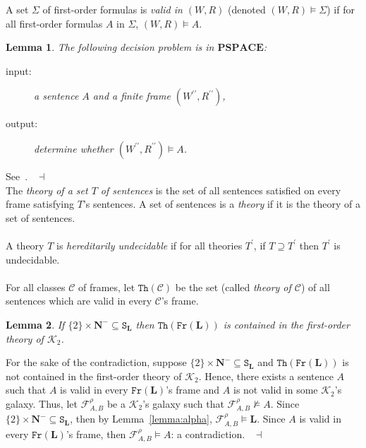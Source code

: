 \documentclass[draft]{article}
\newtheorem{lemma}{Lemma}
\newenvironment{proof}{{\bf Proof:}}{~$\dashv$\\}
\def\Th{\mathtt{Th}}
\def\Fr{\mathtt{Fr}}
\def\PSPACE{\mathbf{PSPACE}}
\def\L{\mathbf{L}}
\begin{document}
A set $\Sigma$ of first-order formulas is {\it valid in $(W,R)$}\/ (denoted $(W,R){\models}\Sigma$) if for all first-order formulas $A$ in $\Sigma$, $(W,R){\models}A$.
%
%
\begin{lemma}\label{lemma:validity:in:a:given:frame:is:in:coNP:fol}
%
%
The following decision problem is in $\PSPACE$:
%
%
\begin{description}
%
%
\item[input:] a sentence $A$ and a finite frame $(W^{\prime\prime},R^{\prime\prime})$,
%
%
\item[output:] determine whether $(W^{\prime\prime},R^{\prime\prime}){\models}A$.
%
%
\end{description}
%
%
\end{lemma}
%
%
\begin{proof}
%
%
See~\cite{Vardi:1982}.
%
%
\medskip
%
%
\end{proof}
%
%
The {\it theory of a set $T$ of sentences}\/ is the set of all sentences satisfied on every frame satisfying $T$'s sentences.
A set of sentences is a {\it theory}\/ if it is the theory of a set of sentences.
%
%
\\
\\
%
%
A theory $T$ is {\it hereditarily undecidable}\/ if for all theories $T^{\prime}$, if $T{\supseteq}T^{\prime}$ then $T^{\prime}$ is undecidable.
%
%
\\
\\
%
%
For all classes ${\mathcal C}$ of frames, let $\Th({\mathcal C})$ be the set (called {\it theory of ${\mathcal C}$}) of all sentences which are valid in every ${\mathcal C}$'s frame.
%
%
\begin{lemma}\label{lemma:gamma}
%
%
If $\{2\}{\times}\mathbf{N}^{-}{\subseteq}\mathtt{S}_{\L}$ then $\Th(\Fr(\L))$ is contained in the first-order
%
%
%
%
%
%
%
%
%
%
%
%
\linebreak
%
%
%
%
%
%
%
%
%
%
%
%
theory of ${\mathcal K}_{2}$.
%
%
\end{lemma}
%
%
\begin{proof}
%
%
For the sake of the contradiction, suppose $\{2\}{\times}\mathbf{N}^{-}{\subseteq}\mathtt{S}_{\L}$ and $\Th(\Fr(\L))$ is not contained in the first-order theory of ${\mathcal K}_{2}$.
Hence, there exists a sentence $A$ such that $A$ is valid in every $\Fr(\L)$'s frame and $A$ is not valid in some ${\mathcal K}_{2}$'s galaxy.
Thus, let ${\mathcal F}_{A,B}^{\rho}$ be a ${\mathcal K}_{2}$'s galaxy such that ${\mathcal F}_{A,B}^{\rho}{\not\models}A$.
Since $\{2\}{\times}\mathbf{N}^{-}{\subseteq}\mathtt{S}_{\L}$, then by Lemma~\ref{lemma:alpha}, ${\mathcal F}_{A,B}^{\rho}{\models}\L$.
Since $A$ is valid in every $\Fr(\L)$'s frame, then ${\mathcal F}_{A,B}^{\rho}{\models}A$: a contradiction.
%
%
\medskip
%
%
\end{proof}
\end{document}
